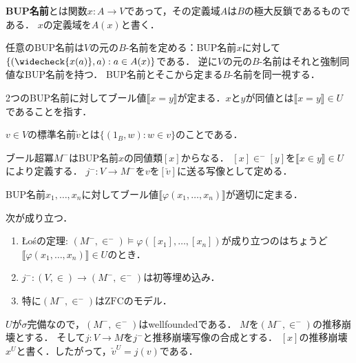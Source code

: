 \documentclass[uplatex,dvipdfmx]{jsarticle}
\newcommand{\ZFC}{\mathrm{ZFC}}
\newcommand{\truth}[1]{\llbracket #1 \rrbracket}
\theoremstyle{definition}
\begin{document}
	\textbf{BUP名前}とは関数$x \colon A \to V$であって，その定義域$A$は$B$の極大反鎖であるものである．
	$x$の定義域を$A(x)$と書く．
	
	任意のBUP名前は$V$の元の$B$-名前を定める：BUP名前$x$に対して$\{ (\widecheck{x(a)}, a) : a \in A(x) \}$である．
	逆に$V$の元の$B$-名前はそれと強制同値なBUP名前を持つ．
	BUP名前とそこから定まる$B$-名前を同一視する．
	
	2つのBUP名前に対してブール値$\truth{x=y}$が定まる．$x$と$y$が同値とは$\truth{x=y} \in U$であることを指す．
	
	$v \in V$の標準名前$\check{v}$とは$\{ (1_B, w) : w \in v \}$のことである．
	
	ブール超冪$M^-$はBUP名前$x$の同値類$[x]$からなる．
	$[x] \in^- [y]$を$\truth{x \in y} \in U$により定義する．
	$j^- \colon V \to M^-$を$v$を$[\check{v}]$に送る写像として定める．
	
	BUP名前$x_1, \dots, x_n$に対してブール値$\truth{\varphi(x_1, \dots, x_n)}$が適切に定まる．

	次が成り立つ．
	\begin{enumerate}
		\item Łośの定理: $(M^-, \in^-) \models \varphi([x_1], \dots, [x_n])$が成り立つのはちょうど$\truth{\varphi(x_1, \dots, x_n)} \in U$のとき．
		\item $j^- \colon (V, \in) \to (M^-, \in^-)$は初等埋め込み．
		\item 特に$(M^-, \in^-)$は$\ZFC$のモデル．
	\end{enumerate}
	
	$U$が$\sigma$完備なので，$(M^-, \in^-)$はwellfoundedである．
	$M$を$(M^-, \in^-)$の推移崩壊とする．
	そして$j \colon V \to M$を$j^-$と推移崩壊写像の合成とする．
	$[x]$の推移崩壊$x^U$と書く．したがって，$\check{v}^U = j(v)$である．
\end{document}
